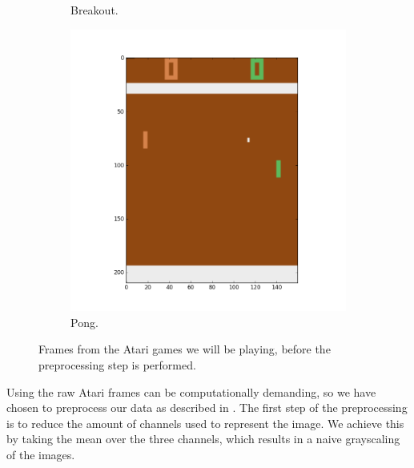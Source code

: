 \documentclass[11pt]{article}
\begin{document}
\begin{figure}[H]
\begin{subfigure}{.3\textwidth}
        \caption{Breakout.}
        \label{fig:scanlike}
    \end{subfigure}
    \begin{subfigure}{.3\textwidth}
        \centering
        \includegraphics[scale=0.25]{include/pong_1.png}
        \caption{Pong.}
        \label{fig:scan}
    \end{subfigure}
    \caption{Frames from the Atari games we will be playing, before the preprocessing step is performed.}
     \label{fig:games}
\end{figure}
Using the raw Atari frames can be computationally demanding, so we have chosen
to preprocess our data as described in \cite{dqn}. 
The first step of the preprocessing is to reduce the amount of channels used to
represent the image.
We achieve this by taking the mean over the three channels, which results
in a naive grayscaling of the images.
\end{document}
